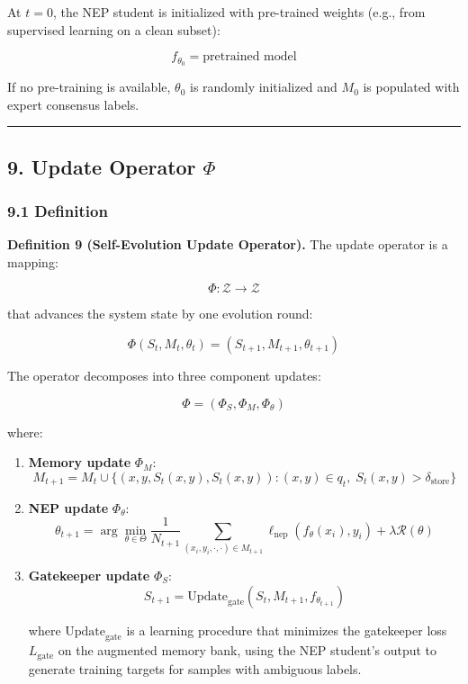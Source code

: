\documentclass[
  12pt,
]{article}
\begin{document}
At \(t=0\), the NEP student is initialized with pre-trained weights
(e.g., from supervised learning on a clean subset):

\[f_{\theta_0} = \text{pretrained model}\]

If no pre-training is available, \(\theta_0\) is randomly initialized
and \(M_0\) is populated with expert consensus labels.

\begin{center}\rule{0.5\linewidth}{0.5pt}\end{center}

\subsection{\texorpdfstring{9. Update Operator
\(\Phi\)}{9. Update Operator \textbackslash Phi}}\label{update-operator-phi}

\subsubsection{9.1 Definition}\label{definition-5}

\textbf{Definition 9 (Self-Evolution Update Operator).} The update
operator is a mapping:

\[\Phi: \mathcal{Z} \to \mathcal{Z}\]

that advances the system state by one evolution round:

\[\Phi(S_t, M_t, \theta_t) = (S_{t+1}, M_{t+1}, \theta_{t+1})\]

The operator decomposes into three component updates:

\[\Phi = (\Phi_S, \Phi_M, \Phi_\theta)\]

where:

\begin{enumerate}
\def\labelenumi{\arabic{enumi}.}
\item
  \textbf{Memory update} \(\Phi_M\):
  \[M_{t+1} = M_t \cup \{(x, y, S_t(x,y), S_t(x,y)) : (x,y) \in q_t, \; S_t(x,y) > \delta_{\text{store}}\}\]
\item
  \textbf{NEP update} \(\Phi_\theta\):
  \[\theta_{t+1} = \arg\min_{\theta \in \Theta} \frac{1}{N_{t+1}} \sum_{(x_i,y_i,\cdot,\cdot) \in M_{t+1}} \ell_{\text{nep}}(f_\theta(x_i), y_i) + \lambda \mathcal{R}(\theta)\]
\item
  \textbf{Gatekeeper update} \(\Phi_S\):
  \[S_{t+1} = \text{Update}_{\text{gate}}(S_t, M_{t+1}, f_{\theta_{t+1}})\]

  where \(\text{Update}_{\text{gate}}\) is a learning procedure that
  minimizes the gatekeeper loss \(L_{\text{gate}}\) on the augmented
  memory bank, using the NEP student's output to generate training
  targets for samples with ambiguous labels.
\end{enumerate}
\end{document}
